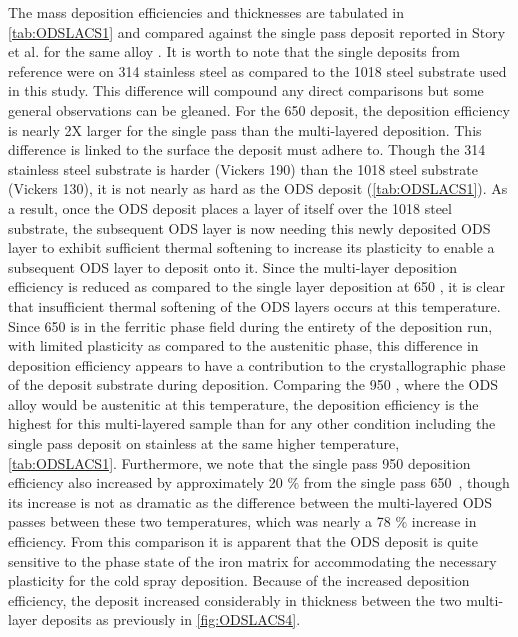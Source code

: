 	 		The mass deposition efficiencies and thicknesses are tabulated in \ref{tab:ODSLACS1} and compared against the single pass deposit reported in Story et al. for the same alloy \cite{RN383}. It is worth to note that the single deposits from reference \cite{RN383} were on 314 stainless steel as compared to the 1018 steel substrate used in this study. This difference will compound any direct comparisons but some general observations can be gleaned. For the 650 \celsius{} deposit, the deposition efficiency is nearly 2X larger for the single pass than the multi-layered deposition. This difference is linked to the surface the deposit must adhere to. Though the 314 stainless steel substrate is harder (Vickers 190) than the 1018 steel substrate (Vickers 130), it is not nearly as hard as the ODS deposit (\ref{tab:ODSLACS1}). As a result, once the ODS deposit places a layer of itself over the 1018 steel substrate, the subsequent ODS layer is now needing this newly deposited ODS layer to exhibit sufficient thermal softening to increase its plasticity to enable a subsequent ODS layer to deposit onto it. Since the multi-layer deposition efficiency is reduced as compared to the single layer deposition at 650 \celsius{}, it is clear that insufficient thermal softening of the ODS layers occurs at this temperature. Since 650 \celsius{} is in the ferritic phase field during the entirety of the deposition run, with limited plasticity as compared to the austenitic phase, this difference in deposition efficiency appears to have a contribution to the crystallographic phase of the deposit substrate during deposition. Comparing the 950 \celsius{}, where the ODS alloy would be austenitic at this temperature, the deposition efficiency is the highest for this multi-layered sample than for any other condition including the single pass deposit on stainless at the same higher temperature, \ref{tab:ODSLACS1}. Furthermore, we note that the single pass 950 \celsius{} deposition efficiency also increased by approximately 20 $\%$  from the single pass 650 \celsius{}, though its increase is not as dramatic as the difference between the multi-layered ODS passes between these two temperatures, which was nearly a 78 $\%$  increase in efficiency. From this comparison it is apparent that the ODS deposit is quite sensitive to the phase state of the iron matrix for accommodating the necessary plasticity for the cold spray deposition. Because of the increased deposition efficiency, the deposit increased considerably in thickness between the two multi-layer deposits as previously in \ref{fig:ODSLACS4}. 



